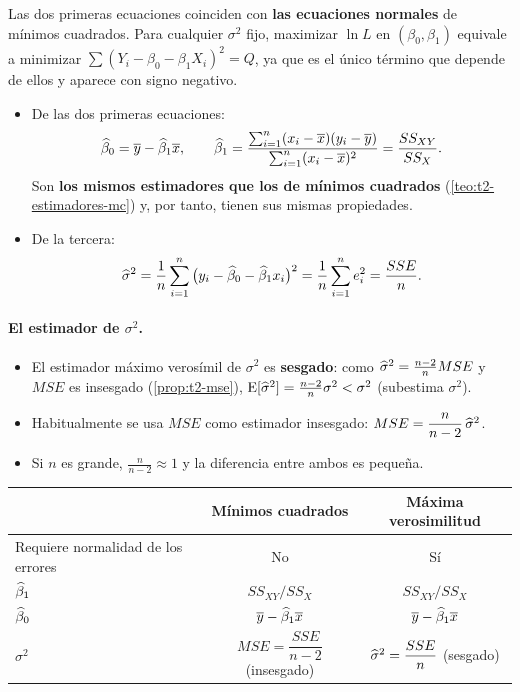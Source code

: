 \begin{nota}
  Las dos primeras ecuaciones coinciden con \textbf{las ecuaciones normales} de mínimos
  cuadrados. Para cualquier $\sigma^2$ fijo, maximizar $\ln L$ en $(\beta_0,\beta_1)$ equivale a
  minimizar $\sum (Y_i-\beta_0-\beta_1X_i)^2=Q$, ya que es el único término que depende de
  ellos y aparece con signo negativo.
\end{nota}

\begin{teorema}
  \begin{itemize}
    \item De las dos primeras ecuaciones:
      \[
        \widehat{\beta}_0 = \overline{y}-\widehat{\beta}_1\overline{x},
        \qquad
        \widehat{\beta}_1 = \frac{\sum_{i=1}^{n} (x_i-\overline{x})(y_i-\overline{y})}{\sum_{i=1}^{n} (x_i-\overline{x})^2}
        = \frac{SS_{XY}}{SS_X}.
      \]
      Son \textbf{los mismos estimadores que los de mínimos cuadrados}
      (\cref{teo:t2-estimadores-mc}) y, por tanto, tienen sus mismas propiedades.
    \item De la tercera:
      \[
        \widehat{\sigma}^2 = \frac1n\sum_{i=1}^{n} \big(y_i-\widehat{\beta}_0-\widehat{\beta}_1x_i\big)^2
        = \frac1n\sum_{i=1}^{n} e_i^2 = \frac{SSE}{n}.
      \]
  \end{itemize}
\end{teorema}

\paragraph{El estimador de $\sigma^2$.}
\begin{itemize}
  \item El estimador máximo verosímil de $\sigma^2$ es \textbf{sesgado}: como
    $\widehat{\sigma}^2=\frac{n-2}{n}MSE$ y $MSE$ es insesgado (\cref{prop:t2-mse}),
    $\operatorname{E}[\widehat{\sigma}^2]=\frac{n-2}{n}\sigma^2<\sigma^2$ (subestima $\sigma^2$).
  \item Habitualmente se usa $MSE$ como estimador insesgado:
    $MSE=\dfrac{n}{n-2}\,\widehat{\sigma}^2$.
  \item Si $n$ es grande, $\frac{n}{n-2}\approx1$ y la diferencia entre ambos es pequeña.
\end{itemize}

\begin{resumen}
  \centering
  \small
  \renewcommand{\arraystretch}{1.5}
  \begin{tabular}{lcc}
    \toprule
    & \textbf{Mínimos cuadrados} & \textbf{Máxima verosimilitud} \\
    \midrule
    Requiere normalidad de los errores & No & Sí \\
    $\widehat{\beta}_1$ & $SS_{XY}/SS_X$ & $SS_{XY}/SS_X$ \\
    $\widehat{\beta}_0$ & $\overline{y}-\widehat{\beta}_1\overline{x}$ & $\overline{y}-\widehat{\beta}_1\overline{x}$ \\
    $\sigma^2$ & $MSE=\dfrac{SSE}{n-2}$ (insesgado) & $\widehat{\sigma}^2=\dfrac{SSE}{n}$ (sesgado) \\
    \bottomrule
  \end{tabular}
\end{resumen}
